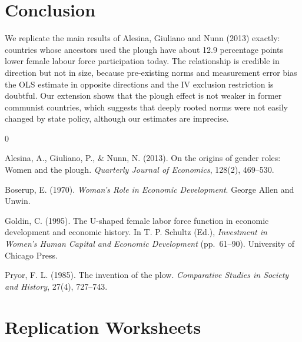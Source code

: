 \documentclass[11pt,a4paper]{article}
\begin{document}
\section{Conclusion}
We replicate the main results of Alesina, Giuliano and Nunn (2013) exactly: countries whose ancestors used the plough have about 12.9 percentage points lower female labour force participation today. The relationship is credible in direction but not in size, because pre-existing norms and measurement error bias the OLS estimate in opposite directions and the IV exclusion restriction is doubtful. Our extension shows that the plough effect is not weaker in former communist countries, which suggests that deeply rooted norms were not easily changed by state policy, although our estimates are imprecise.

\begin{thebibliography}{0}
\makeatletter\renewcommand\@biblabel[1]{}\makeatother
\setlength{\leftskip}{1.5em}\setlength{\itemindent}{-1.5em}

 Alesina, A., Giuliano, P., \& Nunn, N. (2013). On the origins of gender roles: Women and the plough. \textit{Quarterly Journal of Economics}, 128(2), 469--530.

 Boserup, E. (1970). \textit{Woman's Role in Economic Development}. George Allen and Unwin.

 Goldin, C. (1995). The U-shaped female labor force function in economic development and economic history. In T. P. Schultz (Ed.), \textit{Investment in Women's Human Capital and Economic Development} (pp.~61--90). University of Chicago Press.

 Pryor, F. L. (1985). The invention of the plow. \textit{Comparative Studies in Society and History}, 27(4), 727--743.
\end{thebibliography}

\clearpage
\appendix
\section{Replication Worksheets}
\end{document}
